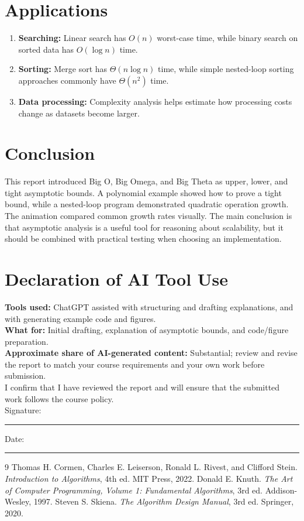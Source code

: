 \documentclass[11pt,a4paper]{article}
\begin{document}
\section{Applications}
\begin{enumerate}
\item \textbf{Searching:} Linear search has $O(n)$ worst-case time, while binary search on sorted data has $O(\log n)$ time.
\item \textbf{Sorting:} Merge sort has $\Theta(n\log n)$ time, while simple nested-loop sorting approaches commonly have $\Theta(n^2)$ time.
\item \textbf{Data processing:} Complexity analysis helps estimate how processing costs change as datasets become larger.
\end{enumerate}

\section{Conclusion}
This report introduced Big O, Big Omega, and Big Theta as upper, lower, and tight asymptotic bounds. A polynomial example showed how to prove a tight bound, while a nested-loop program demonstrated quadratic operation growth. The animation compared common growth rates visually. The main conclusion is that asymptotic analysis is a useful tool for reasoning about scalability, but it should be combined with practical testing when choosing an implementation.

\section*{Declaration of AI Tool Use}
\textbf{Tools used:} ChatGPT assisted with structuring and drafting explanations, and with generating example code and figures.\\
\textbf{What for:} Initial drafting, explanation of asymptotic bounds, and code/figure preparation.\\
\textbf{Approximate share of AI-generated content:} Substantial; review and revise the report to match your course requirements and your own work before submission.\\
I confirm that I have reviewed the report and will ensure that the submitted work follows the course policy.\\[1cm]
Signature: \rule{4cm}{0.4pt}\hfill Date: \rule{3cm}{0.4pt}

\begin{thebibliography}{9}
Thomas H. Cormen, Charles E. Leiserson, Ronald L. Rivest, and Clifford Stein.
\textit{Introduction to Algorithms}, 4th ed. MIT Press, 2022.
Donald E. Knuth. \textit{The Art of Computer Programming, Volume 1: Fundamental Algorithms}, 3rd ed. Addison-Wesley, 1997.
Steven S. Skiena. \textit{The Algorithm Design Manual}, 3rd ed. Springer, 2020.
\end{thebibliography}
\end{document}
